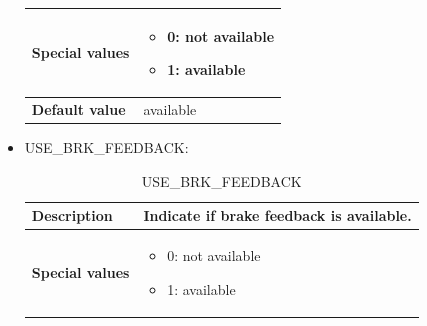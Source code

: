 \documentclass{template/openetcs}
\begin{document}
\begin{itemize}
\begin{longtable}{|l|l|}
				\hline
																																									
					\begin{minipage}[t]{0.22\linewidth} \textbf{Special values}	\end{minipage} 
				&	\begin{minipage}[t]{0.78\linewidth} \begin{itemize} \item 0: not available \item 1: available \end{itemize} \end{minipage} \\
				
				\hline
				
					\begin{minipage}[t]{0.22\linewidth} \textbf{Default value}	\end{minipage} 
				&	\begin{minipage}[t]{0.78\linewidth} available \end{minipage} \\
				
				\hline
				
			\end{longtable}
			
		\item USE\_BRK\_FEEDBACK:
											
			\begin{longtable}{|l|l|}
				\caption{USE\_BRK\_FEEDBACK}\\ 
				\hline
				
					\begin{minipage}[t]{0.22\linewidth} \textbf{Description}	\end{minipage} 
				&	\begin{minipage}[t]{0.78\linewidth} Indicate if brake feedback is available. \end{minipage} \\
				
				\hline
																																									
					\begin{minipage}[t]{0.22\linewidth} \textbf{Special values}	\end{minipage} 
				&	\begin{minipage}[t]{0.78\linewidth} \begin{itemize} \item 0: not available \item 1: available \end{itemize} \end{minipage} \\
				

\end{longtable}
\end{itemize}
\end{document}
